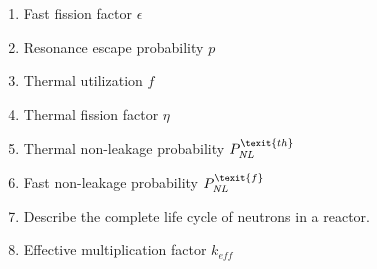 \documentclass{article}
\begin{document}
\begin{enumerate}
	\item{Fast fission factor $\epsilon$}\\
	\item{Resonance escape probability $\textit{p}$}\\
	\item{Thermal utilization $\textit{f}$}\\
	\item{Thermal fission factor $\eta$}\\
	\item{Thermal non-leakage probability $P_{\textit{NL}}^{\texit{th}}$}\\
	\item{Fast non-leakage probability $P_{\textit{NL}}^{\texit{f}}$}\\
	\item{Describe the complete life cycle of neutrons in a reactor.}\\
	\item{Effective multiplication factor $\textit{$k_{eff}$}$}
\end{enumerate}
\end{document}
